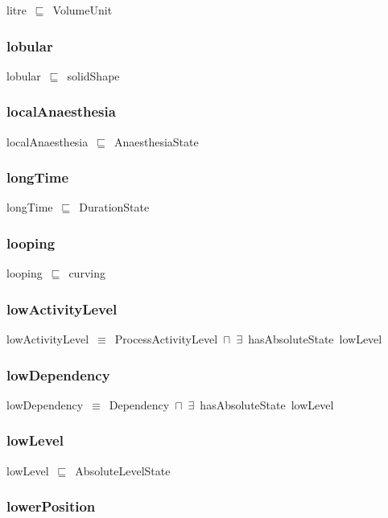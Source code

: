 \documentclass{article}
\begin{document}
litre~\ensuremath{\sqsubseteq}~VolumeUnit~

\subsubsection*{lobular}

lobular~\ensuremath{\sqsubseteq}~solidShape~

\subsubsection*{localAnaesthesia}

localAnaesthesia~\ensuremath{\sqsubseteq}~AnaesthesiaState~

\subsubsection*{longTime}

longTime~\ensuremath{\sqsubseteq}~DurationState~

\subsubsection*{looping}

looping~\ensuremath{\sqsubseteq}~curving~

\subsubsection*{lowActivityLevel}

lowActivityLevel~\ensuremath{\equiv}~ProcessActivityLevel~\ensuremath{\sqcap}~\ensuremath{\exists}~hasAbsoluteState~lowLevel

\subsubsection*{lowDependency}

lowDependency~\ensuremath{\equiv}~Dependency~\ensuremath{\sqcap}~\ensuremath{\exists}~hasAbsoluteState~lowLevel

\subsubsection*{lowLevel}

lowLevel~\ensuremath{\sqsubseteq}~AbsoluteLevelState~

\subsubsection*{lowerPosition}
\end{document}
